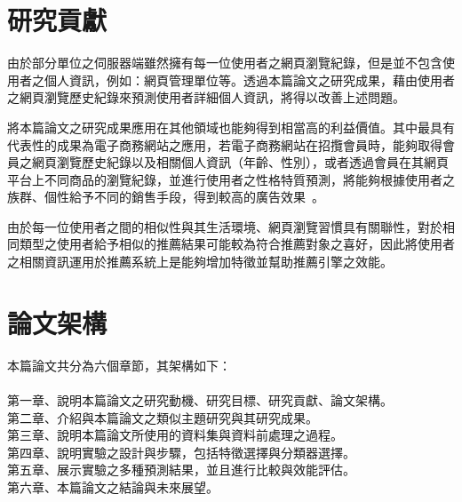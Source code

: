 \section{研究貢獻}
{
由於部分單位之伺服器端雖然擁有每一位使用者之網頁瀏覽紀錄，但是並不包含使用者之個人資訊，例如：網頁管理單位等。透過本篇論文之研究成果，藉由使用者之網頁瀏覽歷史紀錄來預測使用者詳細個人資訊，將得以改善上述問題。\par

將本篇論文之研究成果應用在其他領域也能夠得到相當高的利益價值。其中最具有代表性的成果為電子商務網站之應用，若電子商務網站在招攬會員時，能夠取得會員之網頁瀏覽歷史紀錄以及相關個人資訊（年齡、性別），或者透過會員在其網頁平台上不同商品的瀏覽紀錄，並進行使用者之性格特質預測，將能夠根據使用者之族群、個性給予不同的銷售手段，得到較高的廣告效果~\cite{luo2016online}。\par

由於每一位使用者之間的相似性與其生活環境、網頁瀏覽習慣具有關聯性，對於相同類型之使用者給予相似的推薦結果可能較為符合推薦對象之喜好，因此將使用者之相關資訊運用於推薦系統上是能夠增加特徵並幫助推薦引擎之效能。
}
\clearpage
\section{論文架構}
{
本篇論文共分為六個章節，其架構如下：\\
\\
第一章、說明本篇論文之研究動機、研究目標、研究貢獻、論文架構。\\
第二章、介紹與本篇論文之類似主題研究與其研究成果。\\
第三章、說明本篇論文所使用的資料集與資料前處理之過程。\\
第四章、說明實驗之設計與步驟，包括特徵選擇與分類器選擇。\\
第五章、展示實驗之多種預測結果，並且進行比較與效能評估。\\
第六章、本篇論文之結論與未來展望。

}